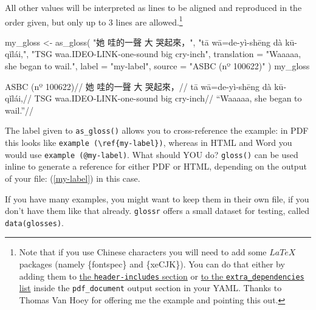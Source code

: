 \documentclass[
  letterpaper,
  DIV=11,
  numbers=noendperiod]{scrartcl}
\newenvironment{Shaded}{\begin{snugshade}}{\end{snugshade}}
\newcommand{\AttributeTok}[1]{\textcolor[rgb]{0.40,0.45,0.13}{#1}}
\newcommand{\FunctionTok}[1]{\textcolor[rgb]{0.28,0.35,0.67}{#1}}
\newcommand{\NormalTok}[1]{\textcolor[rgb]{0.00,0.23,0.31}{#1}}
\newcommand{\OtherTok}[1]{\textcolor[rgb]{0.00,0.23,0.31}{#1}}
\newcommand{\StringTok}[1]{\textcolor[rgb]{0.13,0.47,0.30}{#1}}
\begin{document}
All other values will be interpreted as lines to be aligned and
reproduced in the order given, but only up to 3 lines are
allowed.\footnote{Note that if you use Chinese characters you will need
  to add some \(LaTeX\) packages (namely \{fontspec\} and \{xeCJK\}).
  You can do that either by adding them to
  \href{https://bookdown.org/yihui/rmarkdown-cookbook/latex-preamble.html}{the
  \texttt{header-includes} section} or
  \href{https://bookdown.org/yihui/rmarkdown-cookbook/latex-extra.html}{to
  the \texttt{extra\_dependencies} list} inside the
  \texttt{pdf\_document} output section in your YAML. Thanks to Thomas
  Van Hoey for offering me the example and pointing this out.}

\begin{Shaded}
\begin{Highlighting}[]
\NormalTok{my\_gloss }\OtherTok{\textless{}{-}} \FunctionTok{as\_gloss}\NormalTok{(}
  \StringTok{"她 哇的一聲 大 哭起來，"}\NormalTok{,}
  \StringTok{"tā wā=de{-}yì{-}shēng dà kū{-}qǐlái,"}\NormalTok{,}
  \StringTok{"TSG waa.IDEO{-}LINK{-}one{-}sound big cry{-}inch"}\NormalTok{,}
  \AttributeTok{translation =} \StringTok{"Waaaaa, she began to wail."}\NormalTok{,}
  \AttributeTok{label =} \StringTok{"my{-}label"}\NormalTok{,}
  \AttributeTok{source =} \StringTok{"ASBC (nº 100622)"}
\NormalTok{)}
\NormalTok{my\_gloss}
\end{Highlighting}
\end{Shaded}


\ex\label{my-label} \begingl \glpreamble ASBC (nº 100622)// \gla 她
哇的一聲 大 哭起來，// \glb tā wā=de-yì-shēng dà kū-qǐlái,// \glc TSG
waa.IDEO-LINK-one-sound big cry-inch// \glft ``Waaaaa, she began to
wail.''// \endgl \xe

The label given to \texttt{as\_gloss()} allows you to cross-reference
the example: in PDF this looks like
\texttt{example\ (\textbackslash{}ref\{my-label\})}, whereas in HTML and
Word you would use \texttt{example\ (@my-label)}. What should YOU do?
\texttt{gloss()} can be used inline to generate a reference for either
PDF or HTML, depending on the output of your file: (\ref{my-label}) in
this case.

If you have many examples, you might want to keep them in their own
file, if you don't have them like that already. \texttt{glossr} offers a
small dataset for testing, called \texttt{data(glosses)}.
\end{document}
